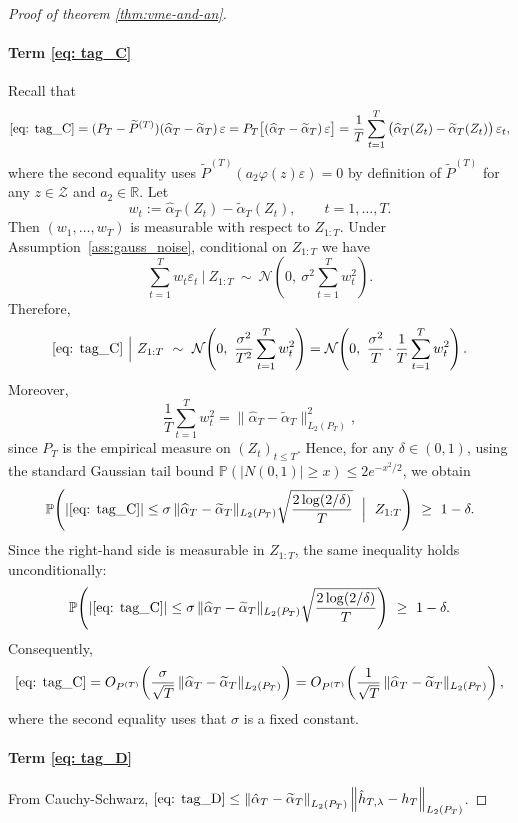 \documentclass[11pt]{article}
\begin{document}
\begin{proof}[Proof of theorem \ref{thm:vme-and-an}]
\paragraph{Term \eqref{eq: tag_C}}
Recall that
\[
\eqref{eq: tag_C}
= (P_T-\widetilde P^{(T)})(\widehat\alpha_T-\widetilde\alpha_T)\,\varepsilon
= P_T\big[(\widehat\alpha_T-\widetilde\alpha_T)\,\varepsilon\big]
= \frac1T\sum_{t=1}^T \big(\widehat\alpha_T(Z_t)-\widetilde\alpha_T(Z_t)\big)\,\varepsilon_t,
\]
where the second equality uses $\widetilde P^{(T)}(a_2 \varphi(z)\varepsilon)=0$ by definition of $\widetilde P^{(T)}$ for any $z\in \mathcal{Z}$ and $a_2\in \mathbb{R}$. Let
\[
w_t := \widehat\alpha_T(Z_t)-\widetilde\alpha_T(Z_t),\qquad t=1,\dots,T.
\]
Then $(w_1,\dots,w_T)$ is measurable with respect to $Z_{1:T}$. Under Assumption~\ref{ass:gauss_noise},
conditional on $Z_{1:T}$ we have
\[
\sum_{t=1}^T w_t\varepsilon_t \ \Big|\ Z_{1:T}\ \sim\ \mathcal{N}\!\left(0,\ \sigma^2\sum_{t=1}^T w_t^2\right).
\]
Therefore,
\[
\eqref{eq: tag_C}\ \Big|\ Z_{1:T}
\ \sim\ \mathcal{N}\!\left(0,\ \frac{\sigma^2}{T^2}\sum_{t=1}^T w_t^2\right)
= \mathcal{N}\!\left(0,\ \frac{\sigma^2}{T}\cdot \frac1T\sum_{t=1}^T w_t^2\right).
\]
Moreover,
\[
\frac1T\sum_{t=1}^T w_t^2
=
\|\widehat\alpha_T-\widetilde\alpha_T\|_{L_2(P_T)}^2,
\]
since $P_T$ is the empirical measure on $(Z_t)_{t\le T}$.
Hence, for any $\delta\in(0,1)$, using the standard Gaussian tail bound
$\mathbb{P}(|N(0,1)|\ge x)\le 2e^{-x^2/2}$, we obtain
\[
\mathbb{P}\!\left(
\left|\eqref{eq: tag_C}\right|
\le
\sigma\,\|\widehat\alpha_T-\widetilde\alpha_T\|_{L_2(P_T)}
\sqrt{\frac{2\log(2/\delta)}{T}}
\ \Bigm|\ Z_{1:T}
\right)\ \ge\ 1-\delta.
\]
Since the right-hand side is measurable in $Z_{1:T}$, the same inequality holds unconditionally:
\[
\mathbb{P}\!\left(
\left|\eqref{eq: tag_C}\right|
\le
\sigma\,\|\widehat\alpha_T-\widetilde\alpha_T\|_{L_2(P_T)}
\sqrt{\frac{2\log(2/\delta)}{T}}
\right)\ \ge\ 1-\delta.
\]
Consequently,
\[
\eqref{eq: tag_C}
=
O_{P^{(T)}}\!\left(\frac{\sigma}{\sqrt T}\,\|\widehat\alpha_T-\widetilde\alpha_T\|_{L_2(P_T)}\right)
=
O_{P^{(T)}}\!\left(\frac{1}{\sqrt T}\,\|\widehat\alpha_T-\widetilde\alpha_T\|_{L_2(P_T)}\right),
\]
where the second equality uses that $\sigma$ is a fixed constant.



\paragraph{Term \eqref{eq: tag_D}} From Cauchy-Schwarz, $\eqref{eq: tag_D} \leq \left\|\hat{\alpha}_T - \widetilde \alpha_T\right\|_{L_2(P_T)} \left\|\hat{h}_{T,\lambda} - h_T\right\|_{L_2(P_T)}$.
\end{proof}
\end{document}
